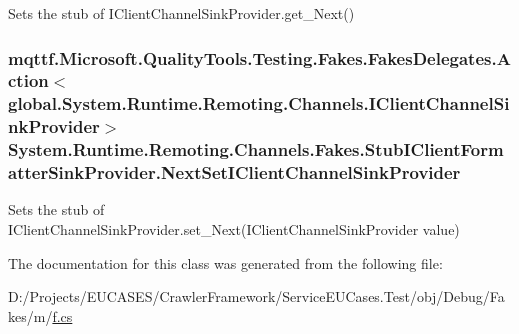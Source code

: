 Sets the stub of I\-Client\-Channel\-Sink\-Provider.\-get\-\_\-\-Next()

\hypertarget{class_system_1_1_runtime_1_1_remoting_1_1_channels_1_1_fakes_1_1_stub_i_client_formatter_sink_provider_a79460c0eb721c5fd1f7ad9e14a8a009f}{
\subsubsection[{Next\-Set\-I\-Client\-Channel\-Sink\-Provider}]{\setlength{\rightskip}{0pt plus 5cm}mqttf.\-Microsoft.\-Quality\-Tools.\-Testing.\-Fakes.\-Fakes\-Delegates.\-Action$<$global.\-System.\-Runtime.\-Remoting.\-Channels.\-I\-Client\-Channel\-Sink\-Provider$>$ System.\-Runtime.\-Remoting.\-Channels.\-Fakes.\-Stub\-I\-Client\-Formatter\-Sink\-Provider.\-Next\-Set\-I\-Client\-Channel\-Sink\-Provider}}\label{class_system_1_1_runtime_1_1_remoting_1_1_channels_1_1_fakes_1_1_stub_i_client_formatter_sink_provider_a79460c0eb721c5fd1f7ad9e14a8a009f}


Sets the stub of I\-Client\-Channel\-Sink\-Provider.\-set\-\_\-\-Next(\-I\-Client\-Channel\-Sink\-Provider value)



The documentation for this class was generated from the following file\-:\begin{DoxyCompactItemize}
\item 
D\-:/\-Projects/\-E\-U\-C\-A\-S\-E\-S/\-Crawler\-Framework/\-Service\-E\-U\-Cases.\-Test/obj/\-Debug/\-Fakes/m/\hyperlink{m_2f_8cs}{f.\-cs}\end{DoxyCompactItemize}
